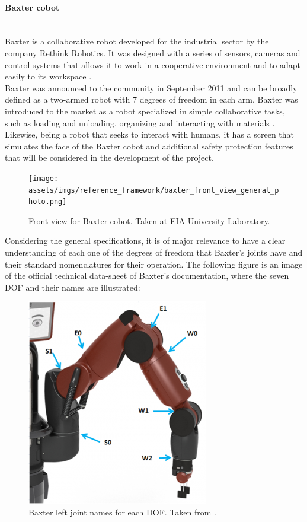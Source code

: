 \documentclass[11pt]{report} %
\newcommand{\subsubsubsection}[1]{\paragraph{#1}\mbox{}\\}
\begin{document}
\subsubsubsection{Baxter cobot}

Baxter is a collaborative robot developed for the industrial sector by the company Rethink Robotics. It was designed with a series of sensors, cameras and control systems that allows it to work in a cooperative environment and to adapt easily to its workspace \citep{cite_rethink_robotics_official_page}.\\

Baxter was announced to the community in September 2011 and can be broadly defined as a two-armed robot with 7 degrees of freedom in each arm. Baxter was introduced to the market as a robot specialized in simple collaborative tasks, such as loading and unloading, organizing and interacting with materials \citep{cite_sdk_baxter_rethink_robotics}. Likewise, being a robot that seeks to interact with humans, it has a screen that simulates the face of the Baxter cobot and additional safety protection features that will be considered in the development of the project.

\begin{figure}[H]
    \centering
    \texttt{[image: assets/imgs/reference\_framework/baxter\_front\_view\_general\_photo.png]}
    \caption{Front view for Baxter cobot. Taken at EIA University Laboratory.} 
    \label{fig_baxter_main_image}
\end{figure}

Considering the general specifications, it is of major relevance to have a clear understanding of each one of the degrees of freedom that Baxter's joints have and their standard nomenclatures for their operation. The following figure is an image of the official technical data-sheet of Baxter's documentation, where the seven DOF and their names are illustrated:

\begin{figure}[H]
    \centering
    \includegraphics[width=0.4\linewidth]{assets/imgs/reference_framework/baxter_joint_names.png}
    \caption{Baxter left joint names for each DOF. Taken from \citep{cite_baxter_joint_names_from_sdk_wiki}.} 
    \label{fig_baxter_joint_names}
\end{figure}
\end{document}
